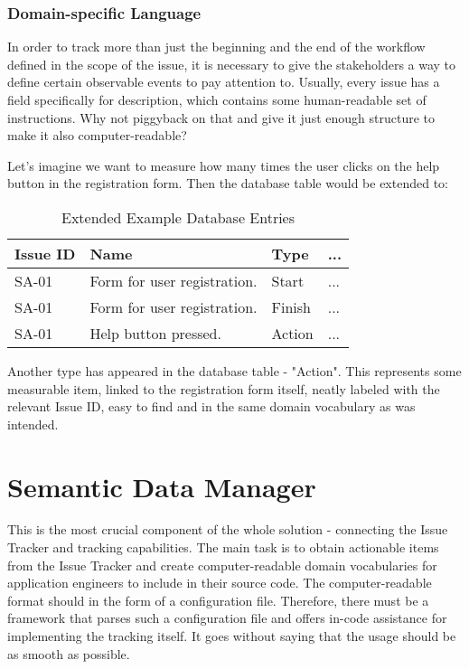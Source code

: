 \subsubsection{Domain-specific Language}

In order to track more than just the beginning and the end of the workflow defined in the scope of the issue, it is necessary to give the stakeholders a way to define certain observable events to pay attention to. Usually, every issue has a field specifically for description, which contains some human-readable set of instructions. Why not piggyback on that and give it just enough structure to make it also computer-readable?

Let's imagine we want to measure how many times the user clicks on the help button in the registration form. Then the database table would be extended to:

\bigbreak

\begin{table}[!ht]
\begin{center}
\begin{tabular}{|l|l|l|l|}
\hline
\textbf{Issue ID} & \textbf{Name} & \textbf{Type} & \textbf{...} \\
\hline
SA-01 & Form for user registration. & Start & ... \\
\hline
SA-01 & Form for user registration. & Finish & ... \\
\hline
SA-01 & Help button pressed. & Action & ...\\
\hline
\end{tabular}
\end{center}
\caption{Extended Example Database Entries}
\label{tab:ex_db2}
\end{table}

Another type has appeared in the database table - "Action". This represents some measurable item, linked to the registration form itself, neatly labeled with the relevant Issue ID, easy to find and in the same domain vocabulary as was intended.

\section{Semantic Data Manager}

This is the most crucial component of the whole solution - connecting the Issue Tracker and tracking capabilities. The main task is to obtain actionable items from the Issue Tracker and create computer-readable domain vocabularies for application engineers to include in their source code. The computer-readable format should in the form of a configuration file. Therefore, there must be a framework that parses such a configuration file and offers in-code assistance for implementing the tracking itself. It goes without saying that the usage should be as smooth as possible.

